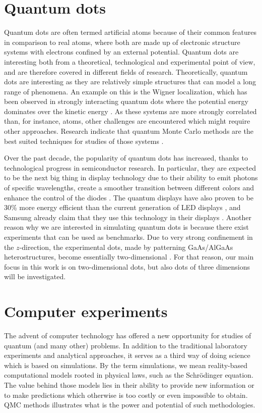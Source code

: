 \section{Quantum dots}
Quantum dots are often termed artificial atoms because of their common features in comparison to real atoms, where both are made up of electronic structure systems with electrons confined by an external potential. Quantum dots are interesting both from a theoretical, technological and experimental point of view, and are therefore covered in different fields of research. Theoretically, quantum dots are interesting as they are relatively simple structures that can model a long range of phenomena. An example on this is the Wigner localization, which has been observed in strongly interacting quantum dots where the potential energy dominates over the kinetic energy \supercite{ghosal_incipient_2007, hogberget_quantum_2013}. As these systems are more strongly correlated than, for instance, atoms, other challenges are encountered which might require other approaches. Research indicate that quantum Monte Carlo methods are the best suited techniques for studies of those systems \supercite{ghosal_incipient_2007}.

Over the past decade, the popularity of quantum dots has increased, thanks to technological progress in semiconductor research. In particular, they are expected to be the next big thing in display technology due to their ability to emit photons of specific wavelengths, create a smoother transition between different colors and enhance the control of the diodes \supercite{noauthor_samsung_nodate}. The quantum displays have also proven to be 30\% more energy efficient than the current generation of LED displays \supercite{manders_8.3:_2015}, and Samsung already claim that they use this technology in their displays \supercite{noauthor_samsung_nodate}. Another reason why we are interested in simulating quantum dots is because there exist experiments that can be used as benchmarks. Due to very strong confinement in the $z$-direction, the experimental dots, made by patterning GaAs/AlGaAs heterostructures, become essentially two-dimensional \supercite{marzin_photoluminescence_1994,brunner_sharp-line_1994}. For that reason, our main focus in this work is on two-dimensional dots, but also dots of three dimensions will be investigated.

\section{Computer experiments}
The advent of computer technology has offered a new opportunity for studies of quantum (and many other) problems. In addition to the traditional laboratory experiments and analytical approaches, it serves as a third way of doing science which is based on simulations. By the term simulations, we mean reality-based computational models rooted in physical laws, such as the Schrödinger equation. The value behind those models lies in their ability to provide new information or to make predictions which otherwise is too costly or even impossible to obtain. QMC methods illustrates what is the power and potential of such methodologies.

